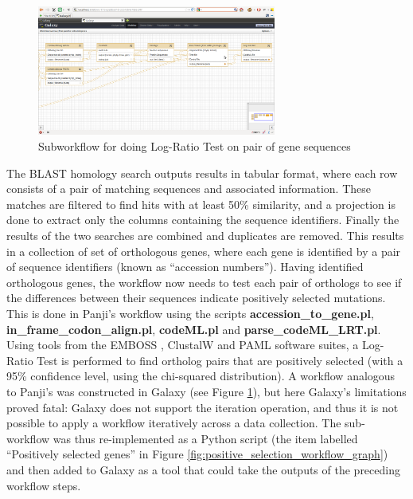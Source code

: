 \documentclass[a4paper,10pt]{scrreprt} \usepackage[utf8]{inputenc}
\begin{document}
\begin{figure}[!htp]
\centering
\includegraphics[width=0.7\textwidth]{images/Subworkflow.png}
\caption{Subworkflow for doing Log-Ratio Test on pair of gene sequences}
\label{fig:Subworkflow}
\end{figure}

The BLAST homology search outputs results in tabular format, where each row consists of a pair of matching sequences and associated information. These matches are filtered to find hits with at least 50\% similarity, and a projection is done to extract only the columns containing the sequence identifiers. Finally the results of the two searches are combined and duplicates are removed. This results in a collection of set of orthologous genes, where each gene is identified by a pair of sequence identifiers (known as ``accession numbers''). Having identified orthologous genes, the workflow now needs to test each pair of orthologs to see if the differences between their sequences indicate positively selected mutations. This is done in Panji's workflow using the scripts \textbf{accession\_to\_gene.pl}, \textbf{in\_frame\_codon\_align.pl}, \textbf{codeML.pl} and \textbf{parse\_codeML\_LRT.pl}. Using tools from the EMBOSS \cite{rice_emboss:_2000}, ClustalW \cite{larkin_clustal_2007} and PAML \cite{yang_paml_2007} 
software suites, a Log-Ratio Test is performed to find ortholog pairs that are positively selected (with a 95\% confidence level, using the chi-squared distribution). A workflow analogous to Panji's was constructed in Galaxy (see Figure \ref{fig:Subworkflow}), but here Galaxy's limitations proved fatal: Galaxy does not support the iteration operation, and thus it is not possible to apply a workflow iteratively across a data collection. The sub-workflow was thus re-implemented as a Python script (the item labelled ``Positively selected genes'' in Figure \ref{fig:positive_selection_workflow_graph}) and then added to Galaxy as a tool that could take the outputs of the preceding workflow steps.
\end{document}
